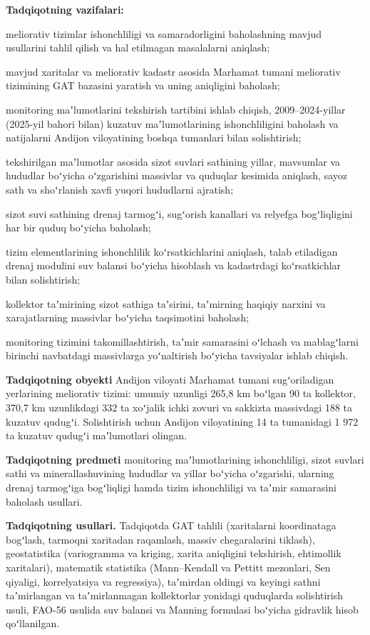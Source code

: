\textbf{Tadqiqotning vazifalari:}

meliorativ tizimlar ishonchliligi va samaradorligini baholashning mavjud
usullarini tahlil qilish va hal etilmagan masalalarni aniqlash;

mavjud xaritalar va meliorativ kadastr asosida Marhamat tumani
meliorativ tizimining GAT bazasini yaratish va uning aniqligini
baholash;

monitoring maʼlumotlarini tekshirish tartibini ishlab chiqish,
2009--2024-yillar (2025-yil bahori bilan) kuzatuv maʼlumotlarining
ishonchliligini baholash va natijalarni Andijon viloyatining boshqa
tumanlari bilan solishtirish;

tekshirilgan maʼlumotlar asosida sizot suvlari sathining yillar,
mavsumlar va hududlar boʻyicha oʻzgarishini massivlar va quduqlar
kesimida aniqlash, sayoz sath va shoʻrlanish xavfi yuqori hududlarni
ajratish;

sizot suvi sathining drenaj tarmogʻi, sugʻorish kanallari va relyefga
bogʻliqligini har bir quduq boʻyicha baholash;

tizim elementlarining ishonchlilik koʻrsatkichlarini aniqlash, talab
etiladigan drenaj modulini suv balansi boʻyicha hisoblash va kadastrdagi
koʻrsatkichlar bilan solishtirish;

kollektor taʼmirining sizot sathiga taʼsirini, taʼmirning haqiqiy
narxini va xarajatlarning massivlar boʻyicha taqsimotini baholash;

monitoring tizimini takomillashtirish, taʼmir samarasini oʻlchash va
mablagʻlarni birinchi navbatdagi massivlarga yoʻnaltirish boʻyicha
tavsiyalar ishlab chiqish.

\textbf{Tadqiqotning obyekti} Andijon viloyati Marhamat tumani
sugʻoriladigan yerlarining meliorativ tizimi: umumiy uzunligi 265,8 km
boʻlgan 90 ta kollektor, 370,7 km uzunlikdagi 332 ta xoʻjalik ichki
zovuri va sakkizta massivdagi 188 ta kuzatuv qudugʻi. Solishtirish uchun
Andijon viloyatining 14 ta tumanidagi 1 972 ta kuzatuv qudugʻi
maʼlumotlari olingan.

\textbf{Tadqiqotning predmeti} monitoring maʼlumotlarining
ishonchliligi, sizot suvlari sathi va minerallashuvining hududlar va
yillar boʻyicha oʻzgarishi, ularning drenaj tarmogʻiga bogʻliqligi hamda
tizim ishonchliligi va taʼmir samarasini baholash usullari.

\textbf{Tadqiqotning usullari.} Tadqiqotda GAT tahlili (xaritalarni
koordinataga bogʻlash, tarmoqni xaritadan raqamlash, massiv
chegaralarini tiklash), geostatistika (variogramma va kriging, xarita
aniqligini tekshirish, ehtimollik xaritalari), matematik statistika
(Mann--Kendall va Pettitt mezonlari, Sen qiyaligi, korrelyatsiya va
regressiya), taʼmirdan oldingi va keyingi sathni taʼmirlangan va
taʼmirlanmagan kollektorlar yonidagi quduqlarda solishtirish usuli,
FAO-56 usulida suv balansi va Manning formulasi boʻyicha gidravlik hisob
qoʻllanilgan.

